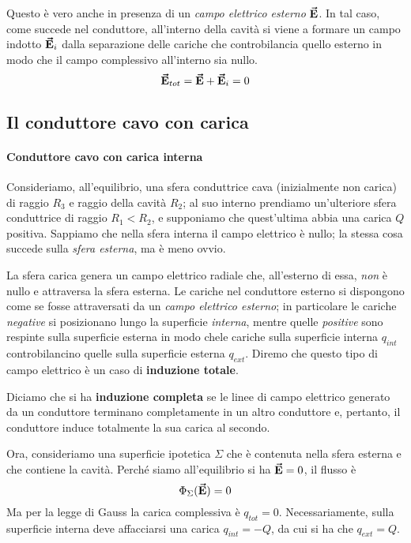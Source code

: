 
Questo è vero anche in presenza di un \textit{campo elettrico esterno} $\vb*{\va{E}}$. In tal caso, come succede nel conduttore, all'interno della cavità si viene a formare un campo indotto $\vb*{\va{E}}_i$ dalla separazione delle cariche  che controbilancia quello esterno in modo che il campo complessivo all'interno sia nullo.
\begin{equation*}
	\vb*{\va{E}}_{tot}=\vb*{\va{E}}+\vb*{\va{E}}_i=0
\end{equation*}
\subsection{Il conduttore cavo con carica}
\paragraph{Conduttore cavo con carica interna}
Consideriamo, all'equilibrio, una sfera conduttrice cava (inizialmente non carica) di raggio $R_3$ e raggio della cavità $R_2$; al suo interno prendiamo un'ulteriore sfera conduttrice di raggio $R_1<R_2$, e supponiamo che quest'ultima abbia una carica $Q$ positiva.
Sappiamo che nella sfera interna il campo elettrico è nullo; la stessa cosa succede sulla \textit{sfera esterna}, ma è meno ovvio.

La sfera carica genera un campo elettrico radiale che, all'esterno di essa, \textit{non} è nullo e attraversa la sfera esterna. Le cariche nel conduttore esterno si dispongono come se fosse attraversati da un \textit{campo elettrico esterno}; in particolare le cariche \textit{negative} si posizionano lungo la superficie \textit{interna}, mentre quelle \textit{positive} sono respinte sulla superficie esterna in modo chele cariche sulla superficie interna $q_{int}$ controbilancino quelle sulla superficie esterna $q_{ext}$. Diremo che questo tipo di campo elettrico è un caso di \textbf{induzione totale}.
\begin{define}
	Diciamo che si ha \textbf{induzione completa} se le linee di campo elettrico generato da un conduttore terminano completamente in un altro conduttore e, pertanto, il conduttore induce totalmente la sua carica al secondo. 
\end{define}

Ora, consideriamo una superficie ipotetica $\Sigma$ che è contenuta nella sfera esterna e che contiene la cavità. Perché siamo all'equilibrio si ha $\vb*{\va{E}}=0$, il flusso è
\begin{equation*}
	\Phi_{\Sigma}(\vb*{\va{E}})=0
\end{equation*}
Ma per la legge di Gauss la carica complessiva è $q_{tot}=0$. Necessariamente, sulla superficie interna deve affacciarsi una carica $q_{int}=-Q$, da cui si ha che $q_{ext}=Q$.

